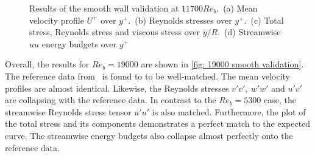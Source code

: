 \begin{figure}
    \centering
    \begin{subfigure}{0.495\textwidth}
        \subcaption{}
       
        \label{subfig: 19000 validation velocity profile}
    \end{subfigure}
    \hfill
    \begin{subfigure}{0.495\textwidth}
        \subcaption{}
       
        \label{subfig: 19000 validation Reynolds stress}
    \end{subfigure}
    \plotverticalspacing
    \begin{subfigure}{0.495\textwidth}
        \subcaption{}
       
        \label{subfig: 19000 validation total stress}
    \end{subfigure}
    \hfill
        \begin{subfigure}{0.495\textwidth}
        \subcaption{}
       
        \label{subfig: 19000 validation budgets}
    \end{subfigure}
    \plotverticalspacing
    \caption{Results of the smooth wall validation at $11700 Re_b$.~(a) Mean velocity profile $U^+$ over $y^+$.~(b) Reynolds stresses over $y^+$.~(c) Total stress, Reynolds stress and viscous stress over $y/R$.~(d) Streamwise $uu$ energy budgets over $y^+$}
        \label{fig: 19000 smooth validation}
\end{figure}

Overall, the results for  $Re_b = 19000 $ are shown in \autoref{fig: 19000 smooth validation}.
The reference data from~\cite{yaoDirectNumericalSimulations2023} is found to to be well-matched. 
The mean velocity profiles are  almost identical.
Likewise, the Reynolds stresses $v'v',\ w'w'$ and $u'v'$ are collapsing with the reference data.
In contrast to  the $Re_b = 5300$ case, the streamwise Reynolds stress tensor $u'u'$ is also matched.
Furthermore, the plot of the total stress and its components demonstrates a perfect match to the expected curve.
The streamwise energy budgets also collapse almost perfectly onto the reference data.

